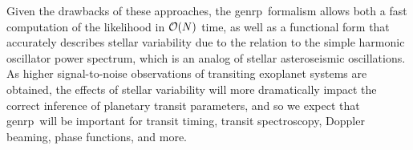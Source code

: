 \documentclass[manuscript, letterpaper]{aastex6}
\makeatletter
\let\origsection\section
\renewcommand\section{\@ifstar{\starsection}{\nostarsection}}
\newcommand\nostarsection[1]{\sectionprelude\origsection{#1}}
\newcommand\starsection[1]{\sectionprelude\origsection*{#1}}
\newcommand\sectionprelude{\vspace{1em}}
\newcommand{\project}[1]{\textsf{#1}}
\newcommand{\genrp}{\project{genrp}}
\makeatother
\begin{document}
Given the drawbacks of these approaches, the \genrp\ formalism allows both a fast
computation of the likelihood in ${\cal O}(N)$ time, as well as a functional form
that accurately describes stellar variability due to the relation to the simple
harmonic oscillator power spectrum, which is an analog of stellar asteroseismic
oscillations.  As higher signal-to-noise observations of transiting exoplanet systems
are obtained, the effects of stellar variability will more dramatically impact the
correct inference of planetary transit parameters, and so we expect that \genrp\
will be important for transit timing, transit spectroscopy, Doppler beaming,
phase functions, and more.

%
%
\end{document}

